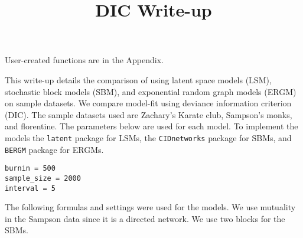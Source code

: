 \documentclass{article}
\begin{document}
 



\title{DIC Write-up}
\maketitle
User-created functions are in the Appendix.

\maketitle

This write-up details the comparison of using latent space models (LSM), stochastic block models (SBM), and exponential random graph models (ERGM) on sample datasets. We compare model-fit using deviance information criterion (DIC). The sample datasets used are Zachary's Karate club, Sampson's monks, and florentine. The parameters below are used for each model. To implement the models the \texttt{latent} package for LSMs, the \texttt{CIDnetworks} package for SBMs, and \texttt{BERGM} package for ERGMs.

\begin{verbatim}
burnin = 500
sample_size = 2000
interval = 5
\end{verbatim}

The following formulas and settings were used for the models. We use mutuality in the Sampson data since it is a directed network. We use two blocks for the SBMs.
\end{document}
